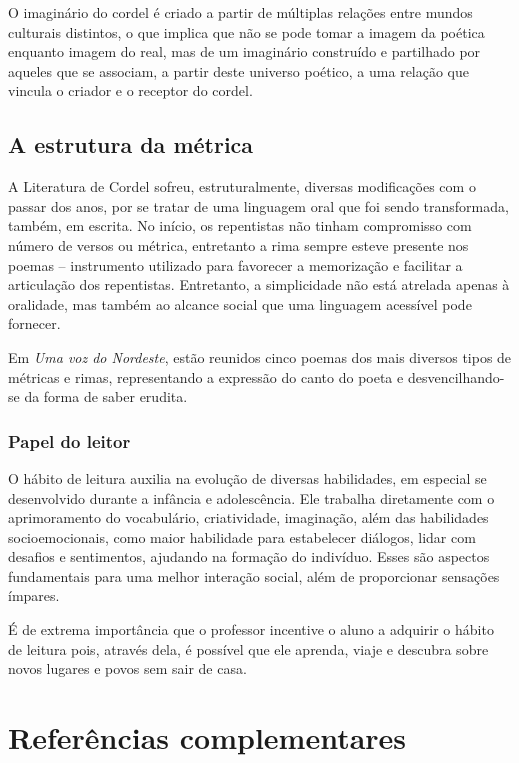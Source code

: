 \documentclass{extarticle}
\begin{document}
O imaginário do cordel é criado a partir de múltiplas relações entre
mundos culturais distintos, o que implica que não se pode tomar a imagem
da poética enquanto imagem do real, mas de um imaginário construído e
partilhado por aqueles que se associam, a partir deste universo poético,
a uma relação que vincula o criador e o receptor do cordel.

\subsection{A estrutura da métrica}

A Literatura de Cordel sofreu, estruturalmente, diversas modificações
com o passar dos anos, por se tratar de uma linguagem oral que foi sendo
transformada, também, em escrita. No início, os repentistas não tinham
compromisso com número de versos ou métrica, entretanto a rima sempre
esteve presente nos poemas -- instrumento utilizado para favorecer a
memorização e facilitar a articulação dos repentistas. Entretanto, a
simplicidade não está atrelada apenas à oralidade, mas também ao alcance
social que uma linguagem acessível pode fornecer.

Em \emph{Uma voz do Nordeste}, estão reunidos cinco poemas dos mais
diversos tipos de métricas e rimas, representando a expressão do canto
do poeta e desvencilhando-se da forma de saber erudita.

\subsubsection{Papel do leitor}

O hábito de leitura auxilia na evolução de diversas habilidades, em
especial se desenvolvido durante a infância e adolescência. Ele trabalha
diretamente com o aprimoramento do vocabulário, criatividade,
imaginação, além das habilidades socioemocionais, como maior habilidade
para estabelecer diálogos, lidar com desafios e sentimentos, ajudando na
formação do indivíduo. Esses são aspectos fundamentais para uma melhor
interação social, além de proporcionar sensações ímpares.

É de extrema importância que o professor incentive o aluno a adquirir o
hábito de leitura pois, através dela, é possível que ele aprenda, viaje
e descubra sobre novos lugares e povos sem sair de casa.

\section{Referências complementares}
\end{document}
